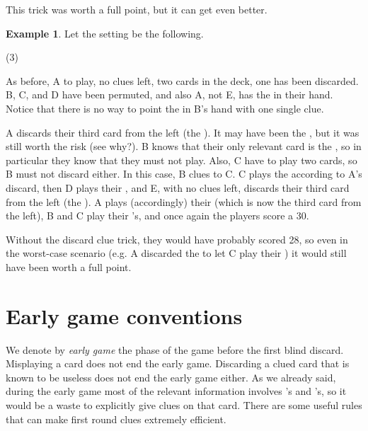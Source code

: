 \documentclass[a4paper]{article}
\theoremstyle{plain}
\theoremstyle{definition}
\newtheorem{example}[theorem]{Example}
\begin{document}
This trick was worth a full point, but it can get even better. 

\begin{example}
	
	Let the setting be the following.
	
	\begin{tasks}(3)
		\task[+]      
		\task[A]    
		\task[B]    
		\task[C]    
		\task[D]    
		\task[E]    
	\end{tasks}
	
	As before, A to play, no clues left, two cards in the deck, one  has been discarded. B, C, and D have been permuted, and also A, not E, has the  in their hand. Notice that there is no way to point the  in B's hand with one single clue.
	
	A discards their third card from the left (the ). It may have been the , but it was still worth the risk (see why?). B knows that their only relevant card is the , so in particular they know that they must not play. Also, C have to play two cards, so B must not discard either. In this case, B clues  to C. C plays the  according to A's discard, then D plays their , and E, with no clues left, discards their third card from the left (the ). A plays (accordingly) their  (which is now the third card from the left), B and C play their 's, and once again the players score a 30.
\end{example}

Without the discard clue trick, they would have probably scored 28, so even in the worst-case scenario (e.g. A discarded the  to let C play their ) it would still have been worth a full point.

\section{Early game conventions}
\label{sec:earlygame}

We denote by \textit{early game} the phase of the game before the first blind discard. Misplaying a card does not end the early game. Discarding a clued card that is known to be useless does not end the early game either. As we already said, during the early game most of the relevant information involves 's and 's, so it would be a waste to explicitly give clues on that card. There are some useful rules that can make first round clues extremely efficient.
\end{document}
